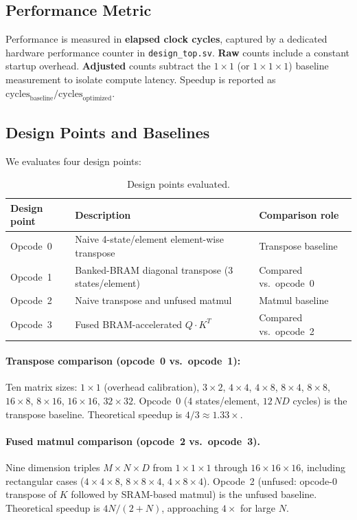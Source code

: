 \documentclass[11pt]{article}
\begin{document}
\subsection{Performance Metric}

Performance is measured in \textbf{elapsed clock cycles}, captured by a
dedicated hardware performance counter in \texttt{design\_top.sv}. \textbf{Raw} counts include a constant startup overhead.
\textbf{Adjusted} counts subtract the $1\!\times\!1$ (or
$1\!\times\!1\!\times\!1$) baseline measurement to isolate compute latency. Speedup is reported as $\text{cycles}_{\text{baseline}} / \text{cycles}_{\text{optimized}}$.


\subsection{Design Points and Baselines}

We evaluates four design points:

\begin{table}[h]
\centering\small
\begin{tabular}{@{}lll@{}}
\toprule
Design point & Description & Comparison role \\
\midrule
Opcode~0 & Naive 4-state/element element-wise transpose &
  Transpose baseline \\
Opcode~1 & Banked-BRAM diagonal transpose (3 states/element) &
  Compared vs.\ opcode~0 \\
Opcode~2 & Naive transpose and unfused matmul &
  Matmul baseline \\
Opcode~3 & Fused BRAM-accelerated $Q\!\cdot\!K^T$ &
  Compared vs.\ opcode~2 \\
\bottomrule
\end{tabular}
\caption{Design points evaluated.}
\end{table}

\paragraph{Transpose comparison (opcode~0 vs.\ opcode~1):}
Ten matrix sizes: $1\!\times\!1$ (overhead calibration), $3\!\times\!2$,
$4\!\times\!4$, $4\!\times\!8$, $8\!\times\!4$, $8\!\times\!8$,
$16\!\times\!8$, $8\!\times\!16$, $16\!\times\!16$, $32\!\times\!32$.
Opcode~0 (4 states/element, $12\,ND$ cycles) is the transpose baseline.
Theoretical speedup is $4/3 \approx 1.33\times$.

\paragraph{Fused matmul comparison (opcode~2 vs.\ opcode~3).}
Nine dimension triples $M\!\times\!N\!\times\!D$ from
$1\!\times\!1\!\times\!1$ through $16\!\times\!16\!\times\!16$, including
rectangular cases ($4\!\times\!4\!\times\!8$, $8\!\times\!8\!\times\!4$,
$4\!\times\!8\!\times\!4$). Opcode~2 (unfused: opcode-0 transpose of $K$
followed by SRAM-based matmul) is the unfused baseline.
Theoretical speedup is $4N/(2\!+\!N)$, approaching $4\times$
for large $N$.
\end{document}

